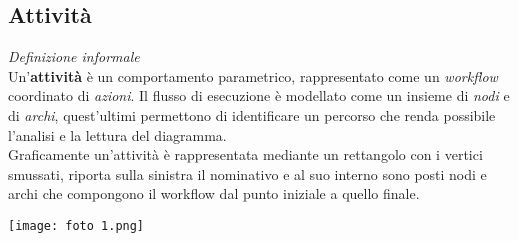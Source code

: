 \documentclass{article}
\begin{document}
\subsection*{Attività}
\large
\textit{Definizione informale}\\Un'\textbf{attività} è un comportamento parametrico, rappresentato come un \textit{workflow} coordinato di \textit{azioni}. Il flusso di esecuzione è modellato come un insieme di \textit{nodi} e di \textit{archi}, quest'ultimi permettono di identificare un percorso che renda possibile l'analisi e la lettura del diagramma.\vspace*{14pt}\\
Graficamente un'attività è rappresentata mediante un rettangolo con i vertici smussati, riporta sulla sinistra il nominativo e al suo interno sono posti nodi e archi che compongono il workflow dal punto iniziale a quello finale.\\
\begin{center}
    \texttt{[image: foto 1.png]}
\end{center}
\end{document}
